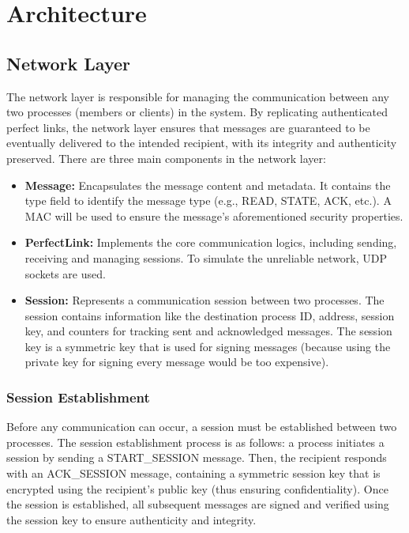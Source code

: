 \documentclass[runningheads]{llncs}
\begin{document}
\section{Architecture}

\subsection{Network Layer}
The network layer is responsible for managing the communication between any two processes (members or clients) in the system. By replicating authenticated perfect links, the network layer ensures that messages are guaranteed to be eventually delivered to the intended recipient, with its integrity and authenticity preserved. There are three main components in the network layer:
\begin{itemize}
    \item \textbf{Message:} Encapsulates the message content and metadata. It contains the type field to identify the message type (e.g., READ, STATE, ACK, etc.). A MAC will be used to ensure the message's aforementioned security properties.
    \item \textbf{PerfectLink:} Implements the core communication logics, including sending, receiving and managing sessions. To simulate the unreliable network, UDP sockets are used.
    \item \textbf{Session:} Represents a communication session between two processes. The session contains information like the destination process ID, address, session key, and counters for tracking sent and acknowledged messages. The session key is a symmetric key that is used for signing messages (because using the private key for signing every message would be too expensive).
\end{itemize}

\subsubsection{Session Establishment}
Before any communication can occur, a session must be established between two processes. The session establishment process is as follows: a process initiates a session by sending a START\_SESSION message. Then, the recipient responds with an ACK\_SESSION message, containing a symmetric session key that is encrypted using the recipient's public key (thus ensuring confidentiality). Once the session is established, all subsequent messages are signed and verified using the session key to ensure authenticity and integrity.
\end{document}
